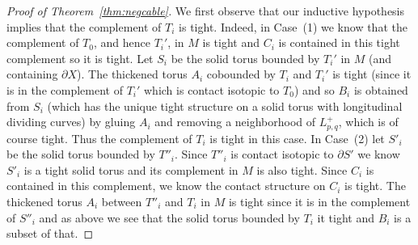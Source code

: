 \documentclass[11pt]{amsart}
\theoremstyle{plain}
\theoremstyle{definition}
\theoremstyle{remark}
\numberwithin{theorem}{section}
\begin{document}
\begin{proof}[Proof of Theorem~\ref{thm:negcable}]
We first observe that our inductive hypothesis implies that the complement of $T_i$ is tight. Indeed, in Case~(1) we know that the complement of $T_0$, and hence $T_i'$, in $M$ is tight and $C_i$ is contained in this tight complement so it is tight. Let $S_i$ be the solid torus bounded by $T_i'$ in $M$ (and containing $\partial X$). The thickened torus $A_i$ cobounded by $T_i$ and $T_i'$ is tight (since it is in the complement of $T_i'$ which is contact isotopic to $T_0$) and so $B_i$ is obtained from $S_i$ (which has the unique tight structure on a solid torus with longitudinal dividing curves) by gluing $A_i$ and removing a neighborhood of $L^+_{p,q}$, which is of course tight. Thus the complement of $T_i$ is tight in this case. In Case~(2) let $S'_i$ be the solid torus bounded by $T''_i$. Since $T''_i$ is contact isotopic to $\partial S'$ we know $S'_i$ is a tight solid torus and its complement in $M$ is also tight. Since $C_i$ is contained in this complement, we know the contact structure on $C_i$ is tight. The thickened torus $A_i$ between $T''_i$ and $T_i$ in $M$ is tight since it is in the complement of $S''_i$ and as above we see that the solid torus bounded by $T_i$ it tight and $B_i$ is a subset of that. 


\end{proof}
\end{document}
